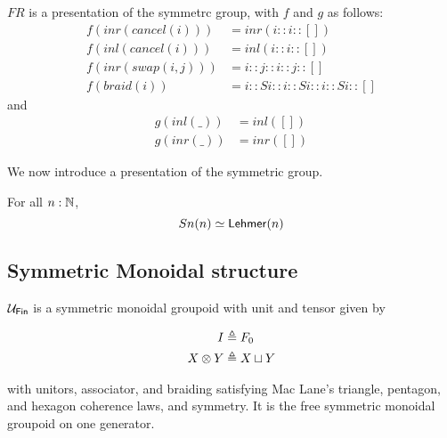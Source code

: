 \begin{proposition}
  $FR$ is a presentation of the symmetrc group, with $f$ and $g$ as follows:
  \begin{align*}
    f (inr (cancel (i))) & = inr (i :: i :: [])                     \\
    f (inl (cancel (i))) & = inl (i :: i :: [])                     \\
    f (inr (swap (i,j))) & = i :: j :: i :: j :: []                 \\
    f (braid (i))        & = i :: S i :: i :: S i :: i :: S i :: []
  \end{align*}
  and
  \begin{align*}
    g (inl (\_)) & = inl ([]) \\
    g (inr (\_)) & = inr ([])
  \end{align*}
\end{proposition}

We now introduce a presentation of the symmetric group.


\begin{theorem}
  For all $n : \mathbb{N}$,
  \[
    Sn(n) \eqv \Lehmer[n]
  \]
\end{theorem}

\subsection{Symmetric Monoidal structure}

$\UFin$ is a symmetric monoidal groupoid with unit and tensor given by

\begin{definition}
  \begin{align*}
    I           & \mathrel{\triangleq} F_{0}    \\
    X \otimes Y & \mathrel{\triangleq} X \sqcup Y
  \end{align*}
\end{definition}

with unitors, associator, and braiding satisfying Mac Lane's triangle, pentagon, and hexagon coherence laws, and
symmetry. It is the free symmetric monoidal groupoid on one generator.

